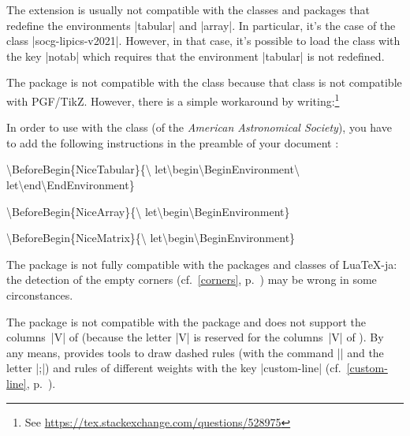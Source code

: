 \documentclass[dvipsnames]{article}
\begin{document}
\begin{Code}
\usepackage[spanish,es-noshorthands]{babel}
\end{Code}

\medskip
The extension  is usually not compatible with the classes and
packages that redefine the environments |{tabular}| and |{array}|. In
particular, it's the case of the class |socg-lipics-v2021|. However, in that
case, it's possible to load the class with the key |notab| which requires that
the environment |{tabular}| is not redefined.

\medskip

The package  is not compatible with the class 
because that class is not compatible with PGF/TikZ. However, there is a simple
workaround by writing:\footnote{See
 \url{https://tex.stackexchange.com/questions/528975}}

\nobreak
{}



\medskip
In order to use  with the class 
(of the \emph{American Astronomical Society}), you have to
add the following instructions in the preamble of your document :

\begin{scope}\ttfamily \color{gray}
\textbackslash BeforeBegin\{NiceTabular\}\{\textbackslash
let\textbackslash begin\textbackslash BeginEnvironment\textbackslash
let\textbackslash end\textbackslash EndEnvironment\}

\textbackslash BeforeBegin\{NiceArray\}\{\textbackslash
let\textbackslash begin\textbackslash BeginEnvironment\}

\textbackslash BeforeBegin\{NiceMatrix\}\{\textbackslash
let\textbackslash begin\textbackslash BeginEnvironment\}
\end{scope}


\medskip
The package  is not fully compatible with the packages and classes
of LuaTeX-ja: the detection of the empty corners (cf.~\ref{corners}, p.~\pageref{corners})
may be wrong in some circonstances.

\medskip
The package  is not compatible with the package
 and does not support the columns~|V| of 
(because the letter |V| is reserved for the columns~|V| of ).
By any means,  provides tools to draw dashed rules (with the command
|\hdashedline| and the letter |;|) and rules of different weights
with the key |custom-line| (cf.~\ref{custom-line},
p.~\pageref{custom-line}).
\end{document}
